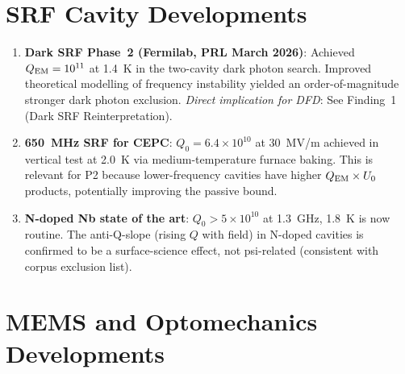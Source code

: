 \documentclass[11pt]{article}
\newcommand{\ee}[1]{\times 10^{#1}}
\newcommand{\QEM}{Q_{\rm EM}}
\theoremstyle{definition}
\theoremstyle{remark}
\begin{document}
\section{SRF Cavity Developments}
\label{sec:srf_lit}

\begin{enumerate}
\item \textbf{Dark SRF Phase~2 (Fermilab, PRL March 2026)}: Achieved
  $\QEM = 10^{11}$ at 1.4~K in the two-cavity dark photon search.
  Improved theoretical modelling of frequency instability yielded
  an order-of-magnitude stronger dark photon exclusion. \emph{Direct
  implication for DFD}: See Finding~1 (Dark SRF Reinterpretation).

\item \textbf{650~MHz SRF for CEPC}: $Q_0 = 6.4\ee{10}$ at 30~MV/m
  achieved in vertical test at 2.0~K via medium-temperature furnace
  baking. This is relevant for P2 because lower-frequency cavities
  have higher $\QEM\times U_0$ products, potentially improving the
  passive bound.

\item \textbf{N-doped Nb state of the art}: $Q_0 > 5\ee{10}$ at
  1.3~GHz, 1.8~K is now routine. The anti-Q-slope (rising $Q$ with
  field) in N-doped cavities is confirmed to be a surface-science
  effect, not psi-related (consistent with corpus exclusion list).
\end{enumerate}

\section{MEMS and Optomechanics Developments}
\label{sec:mems_lit}
\end{document}
